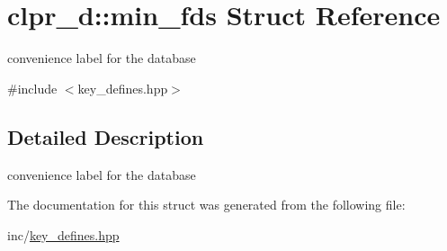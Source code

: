 \hypertarget{structclpr__d_1_1min__fds}{\section{clpr\-\_\-d\-:\-:min\-\_\-fds \-Struct \-Reference}
\label{structclpr__d_1_1min__fds}
}


convenience label for the database  




{\ttfamily \#include $<$key\-\_\-defines.\-hpp$>$}



\subsection{\-Detailed \-Description}
convenience label for the database 

\-The documentation for this struct was generated from the following file\-:\begin{DoxyCompactItemize}
\item 
inc/\hyperlink{key__defines_8hpp}{key\-\_\-defines.\-hpp}\end{DoxyCompactItemize}
